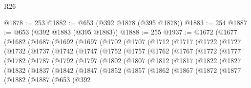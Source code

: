 \begin{lexlean}{R26}
\begin{coremodule}
@1878 := 253
@1882 := @653 (@392 @1878 (@395 @1878))
@1883 := 254
@1887 := @653 (@392 @1883 (@395 @1883))
@1888 := 255
@1937 := @1672
    (@1677
      (@1682
        (@1687
          (@1692
            (@1697
              (@1702
                (@1707
                  (@1712
                    (@1717
                      (@1722
                        (@1727
                          (@1732
                            (@1737
                              (@1742
                                (@1747
                                  (@1752
                                    (@1757
                                      (@1762
                                        (@1767
                                          (@1772
                                            (@1777
                                              (@1782
                                                (@1787
                                                  (@1792
                                                    (@1797
                                                      (@1802
                                                        (@1807
                                                          (@1812
                                                            (@1817
                                                              (@1822
                                                                (@1827
                                                                  (@1832
                                                                    (@1837
                                                                      (@1842
                                                                        (@1847
                                                                          (@1852
                                                                            (@1857
                                                                              (@1862
                                                                                (@1867
                                                                                  (@1872
                                                                                    (@1877
                                                                                      (@1882
                                                                                        (@1887
                                                                                          (@653
                                                                                            (@392

\end{coremodule}
\end{lexlean}
